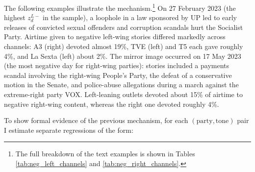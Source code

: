 \documentclass[12pt]{article}
\begin{document}
The following examples illustrate the mechanism.\footnote{The full breakdown of the text examples is shown in Tables \ref{tab:neg_left_channels} and \ref{tab:neg_right_channels}.} On {27 February 2023} (the highest $z_d^{L-}$ in the sample), a loophole in a law sponsored by UP led to early releases of convicted sexual offenders and corruption scandals hurt the Socialist Party. Airtime given to negative left-wing stories differed markedly across channels: A3 (right) devoted almost 19\%, TVE (left) and T5 each gave roughly 4\%, and La Sexta (left) about 2\%. The mirror image occurred on {17 May 2023} (the most negative day for right-wing parties): stories included a payments scandal involving the right-wing People’s Party, the defeat of a conservative motion in the Senate, and police-abuse allegations during a march against the extreme-right party VOX. Left-leaning outlets devoted about 15\% of airtime to negative right-wing content, whereas the right one devoted roughly 4\%. 

	
	




	
 To show formal evidence of the previous mechanism, for each $(\text{party},\text{tone})$ pair I estimate separate regressions of the form:
	
	
	
\end{document}
